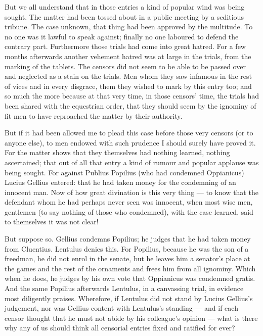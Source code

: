  But we all understand that in those entries a kind of popular wind was being sought. The matter had been tossed about in a public meeting by a seditious tribune. The case unknown, that thing had been approved by the multitude. To no one was it lawful to speak against; finally no one laboured to defend the contrary part. Furthermore those trials had come into great hatred. For a few months afterwards another vehement hatred was at large in the trials, from the marking of the tablets. The censors did not seem to be able to be passed over and neglected as a stain on the trials. Men whom they saw infamous in the rest of vices and in every disgrace, them they wished to mark by this entry too; and so much the more because at that very time, in those censors' time, the trials had been shared with the equestrian order, that they should seem by the ignominy of fit men to have reproached the matter by their authority.

 But if it had been allowed me to plead this case before those very censors (or to anyone else), to men endowed with such prudence I should surely have proved it. For the matter shows that they themselves had nothing learned, nothing ascertained; that out of all that entry a kind of rumour and popular applause was being sought. For against Publius Popilius (who had condemned Oppianicus) Lucius Gellius entered: that he had taken money for the condemning of an innocent man. Now of how great divination is this very thing --- to know that the defendant whom he had perhaps never seen was innocent, when most wise men, gentlemen (to say nothing of those who condemned), with the case learned, said to themselves it was not clear!

 But suppose so. Gellius condemns Popilius; he judges that he had taken money from Cluentius. Lentulus denies this. For Popilius, because he was the son of a freedman, he did not enrol in the senate, but he leaves him a senator's place at the games and the rest of the ornaments and frees him from all ignominy. Which when he does, he judges by his own vote that Oppianicus was condemned gratis. And the same Popilius afterwards Lentulus, in a canvassing trial, in evidence most diligently praises. Wherefore, if Lentulus did not stand by Lucius Gellius's judgement, nor was Gellius content with Lentulus's standing --- and if each censor thought that he must not abide by his colleague's opinion --- what is there why any of us should think all censorial entries fixed and ratified for ever?


